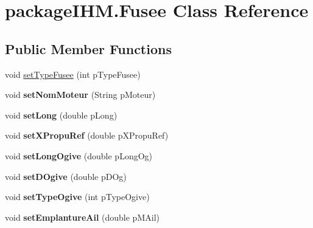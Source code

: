 \hypertarget{classpackage_i_h_m_1_1_fusee}{}\section{package\+I\+H\+M.\+Fusee Class Reference}
\label{classpackage_i_h_m_1_1_fusee}
\subsection*{Public Member Functions}
\begin{DoxyCompactItemize}
\item 
void \mbox{\hyperlink{classpackage_i_h_m_1_1_fusee_a565696aea0d2c2d6de0c1e97df4a0595}{set\+Type\+Fusee}} (int p\+Type\+Fusee)
\item 
\mbox{\label{classpackage_i_h_m_1_1_fusee_aeee79c2de1bf0fe1f65afbe112437cb9}} 
void {\bfseries set\+Nom\+Moteur} (String p\+Moteur)
\item 
\mbox{\label{classpackage_i_h_m_1_1_fusee_a3c255fb77f49e09df344b04881a91af0}} 
void {\bfseries set\+Long} (double p\+Long)
\item 
\mbox{\label{classpackage_i_h_m_1_1_fusee_aa85cf8517f671cd62c3a4a4f5afbda78}} 
void {\bfseries set\+X\+Propu\+Ref} (double p\+X\+Propu\+Ref)
\item 
\mbox{\label{classpackage_i_h_m_1_1_fusee_a99fd69516f079c4726a5a69d2cd26264}} 
void {\bfseries set\+Long\+Ogive} (double p\+Long\+Og)
\item 
\mbox{\label{classpackage_i_h_m_1_1_fusee_a7bd7ff5fdfb52d094a47ab4dc6868e85}} 
void {\bfseries set\+D\+Ogive} (double p\+D\+Og)
\item 
\mbox{\label{classpackage_i_h_m_1_1_fusee_a8b46ca6157234a62c23ca2d23b5ed5f4}} 
void {\bfseries set\+Type\+Ogive} (int p\+Type\+Ogive)
\item 
\mbox{\label{classpackage_i_h_m_1_1_fusee_acde45292d46c140cf574cd10f692d2bf}} 
void {\bfseries set\+Emplanture\+Ail} (double p\+M\+Ail)
\item 

\end{DoxyCompactItemize}
